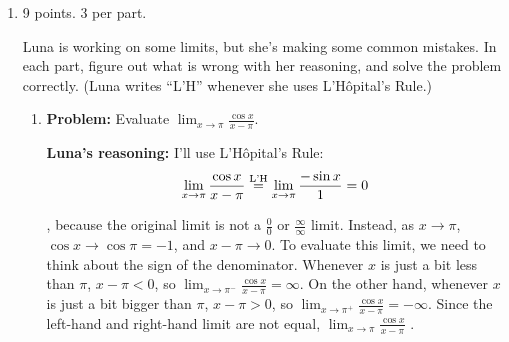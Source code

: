 \documentclass{article}
\begin{document}
\begin{enumerate}
\begin{enumerate}
    \begin{solution}
        As $x \to -\infty$, $e^x \to 0$, so this is a $"0 \cdot \infty"$ limit, and we should rewrite it so that we can use L'H\^opital's
    Rule:
    \begin{align*}
      \lim_{x \to -\infty} x e^x & \nolheq \lim_{x \to -\infty}
      \frac{x}{e^{-x}} \\
      & \lheq \lim_{x \to -\infty} \frac{1}{-e^{-x}} \\
      & \nolheq \boxed{0}
    \end{align*}
    \end{solution}
    
      
    \end{enumerate}
    \probonly{}



\item 

\begin{grading}
    9 points. 3 per part.
\end{grading}

 Luna is working on some limits, but she's making some common
  mistakes.  In each part, figure out what is wrong with her reasoning,
  and solve the problem correctly.  (Luna writes ``L'H'' whenever she uses
  L'H\^opital's Rule.)
  \begin{enumerate}
  \item
    \begin{problem}[\nstretch{1.5}]
      \textbf{Problem:} Evaluate $\displaystyle \lim_{x \to \pi}
      \frac{\cos x}{x - \pi}$.

      \textbf{Luna's reasoning:} I'll use L'H\^opital's Rule:
      \[ \lim_{x \to \pi} \frac{\cos x}{x - \pi} \stackrel{\text{L'H}}{=} \lim_{x \to \pi}
      \frac{-\sin x}{1} = 0 \]
    \end{problem}

    \begin{solution}
      , because the original limit
      is not a $\frac{0}{0}$ or $\frac{\infty}{\infty}$ limit.  Instead,
      as $x \to \pi$, $\cos x \to \cos \pi = -1$, and $x - \pi \to 0$.  To
      evaluate this limit, we need to think about the sign of the
      denominator.  Whenever $x$ is just a bit less than $\pi$, $x - \pi <
      0$, so $\displaystyle \lim_{x \to \pi^-} \frac{\cos x}{x - \pi} =
      \infty$.  On the other hand, whenever $x$ is just a bit bigger than
      $\pi$, $x - \pi > 0$, so $\displaystyle \lim_{x \to \pi^+}
      \frac{\cos x}{x - \pi} = - \infty$.  Since the left-hand and
      right-hand limit are not equal, $\displaystyle \lim_{x \to \pi}
      \frac{\cos x}{x - \pi}$ .
    \end{solution}


\end{enumerate}
\end{enumerate}
\end{document}
